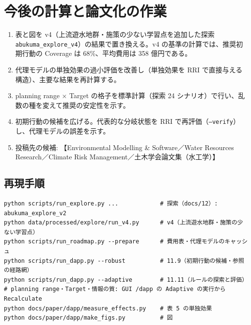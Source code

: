 \documentclass[a4paper,10pt]{ltjsarticle}
\newcommand{\todo}[1]{\textcolor{corange}{【#1】}}
\begin{document}
\section{今後の計算と論文化の作業}
\label{sec:next}
\begin{enumerate}
  \item 表と図を v4（上流遊水地群・施策の少ない学習点を追加した探索 \texttt{abukuma\_explore\_v4}）の結果で置き換える。v4 の基準の計算では、推奨初期行動の Coverage は 68\%、平均費用は 358 億円である。
  \item 代理モデルの単独効果の過小評価を改善し（単独効果を RRI で直接与える構造）、主要な結果を再計算する。
  \item planning range × Target の格子を標準計算（探索 24 シナリオ）で行い、乱数の種を変えて推奨の安定性を示す。
  \item 初期行動の候補を広げる。代表的な分岐状態を RRI で再評価（\texttt{--verify}）し、代理モデルの誤差を示す。
  \item 投稿先の候補: \todo{Environmental Modelling \& Software／Water Resources Research／Climate Risk Management／土木学会論文集（水工学）}
\end{enumerate}

\subsection*{再現手順}
\begin{verbatim}
python scripts/run_explore.py ...            # 探索（docs/12）: abukuma_explore_v2
python data/processed/explore/run_v4.py      # v4（上流遊水地群・施策の少ない学習点）
python scripts/run_roadmap.py --prepare      # 費用表・代理モデルのキャッシュ
python scripts/run_dapp.py --robust          # 11.9（初期行動の候補・参照の経路網）
python scripts/run_dapp.py --adaptive        # 11.11（ルールの探索と評価）
# planning range・Target・情報の質: GUI /dapp の Adaptive の実行から Recalculate
python docs/paper/dapp/measure_effects.py    # 表 5 の単独効果
python docs/paper/dapp/make_figs.py          # 図
\end{verbatim}
\end{document}
